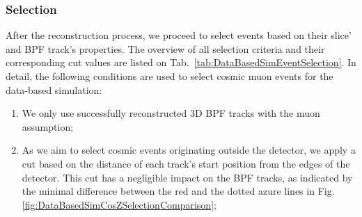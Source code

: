 \subsubsection*{Selection}\label{sec:DataBasedSimSelection}
After the reconstruction process, we proceed to select events based on their slice' and \gls{BPF} track's properties. The overview of all selection criteria and their corresponding cut values are listed on Tab.~\ref{tab:DataBasedSimEventSelection}. In detail, the following conditions are used to select cosmic muon events for the data-based simulation:
\begin{enumerate}
\item We only use successfully reconstructed 3D \gls{BPF} tracks with the muon assumption;
\item As we aim to select cosmic events originating outside the detector, we apply a cut based on the distance of each track's start position from the edges of the detector. This cut has a negligible impact on the \gls{BPF} tracks, as indicated by the minimal difference between the red and the dotted azure lines in Fig. \ref{fig:DataBasedSimCosZSelectionComparison};


\end{enumerate}
